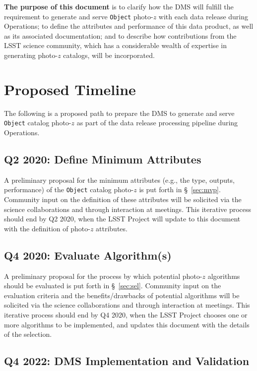\documentclass[DM,lsstdraft,toc]{lsstdoc}
\begin{document}
{\bf The purpose of this document} is to clarify how the DMS will fulfill the requirement to generate and serve {\tt Object} photo-$z$ with each data release during Operations; to define the attributes and performance of this data product, as well as its associated documentation; and to describe how contributions from the LSST science community, which has a considerable wealth of expertise in generating photo-$z$ catalogs, will be incorporated.


\clearpage
\section{Proposed Timeline}\label{sec:time}

The following is a proposed path to prepare the DMS to generate and serve {\tt Object} catalog photo-$z$ as part of the data release processing pipeline during Operations.

\subsection{Q2 2020: Define Minimum Attributes}\label{ssec:time_mvp}

A preliminary proposal for the minimum attributes (e.g., the type, outputs, performance) of the {\tt Object} catalog photo-$z$ is put forth in \S~\ref{sec:mvp}.
Community input on the definition of these attributes will be solicited via the science collaborations and through interaction at meetings.
This iterative process should end by Q2 2020, when the LSST Project will update to this document with the definition of photo-$z$ attributes. 

\subsection{Q4 2020: Evaluate Algorithm(s)}\label{ssec:time_sel}

A preliminary proposal for the process by which potential photo-$z$ algorithms should be evaluated is put forth in \S~\ref{sec:sel}.
Community input on the evaluation criteria and the benefits/drawbacks of potential algorithms will be solicited via the science collaborations and through interaction at meetings.
This iterative process should end by Q4 2020, when the LSST Project chooses one or more algorithms to be implemented, and updates this document with the details of the selection.

\subsection{Q4 2022: DMS Implementation and Validation}\label{ssec:time_impl}
\end{document}
